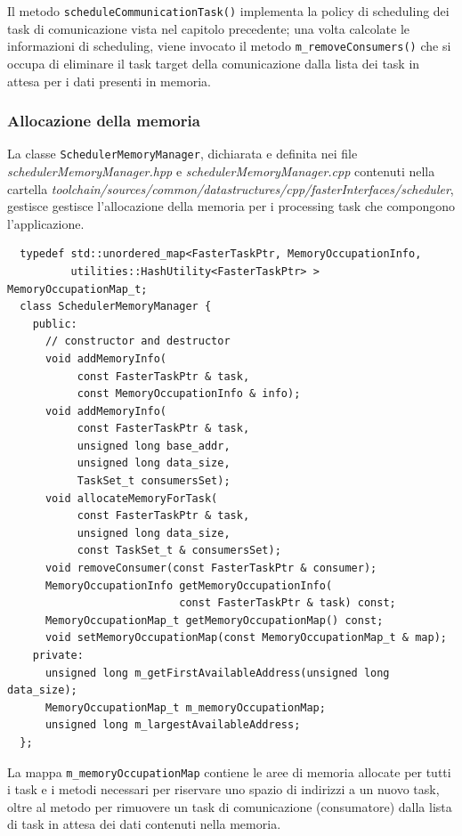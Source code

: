 Il metodo \verb+scheduleCommunicationTask()+ implementa la policy di scheduling dei
task di comunicazione vista nel capitolo precedente; una volta calcolate le informazioni
di scheduling, viene invocato il metodo \verb+m_removeConsumers()+ che si occupa di
eliminare il task target della comunicazione dalla lista dei task in attesa per
i dati presenti in memoria.

\subsubsection{Allocazione della memoria}
La classe \verb+SchedulerMemoryManager+, dichiarata e definita nei file
\emph{schedulerMemoryManager.hpp} e \emph{schedulerMemoryManager.cpp} contenuti nella cartella
\emph{toolchain/sources/common/datastructures/cpp/fasterInterfaces/scheduler}, gestisce
gestisce l'allocazione della memoria per i processing task che compongono l'applicazione.
\newline
\begin{verbatim}
  typedef std::unordered_map<FasterTaskPtr, MemoryOccupationInfo,
          utilities::HashUtility<FasterTaskPtr> > MemoryOccupationMap_t;
  class SchedulerMemoryManager {
    public:
      // constructor and destructor
      void addMemoryInfo(
           const FasterTaskPtr & task,
           const MemoryOccupationInfo & info);
      void addMemoryInfo(
           const FasterTaskPtr & task,
           unsigned long base_addr,
           unsigned long data_size,
           TaskSet_t consumersSet);
      void allocateMemoryForTask(
           const FasterTaskPtr & task,
           unsigned long data_size,
           const TaskSet_t & consumersSet);
      void removeConsumer(const FasterTaskPtr & consumer);
      MemoryOccupationInfo getMemoryOccupationInfo(
                           const FasterTaskPtr & task) const;
      MemoryOccupationMap_t getMemoryOccupationMap() const;
      void setMemoryOccupationMap(const MemoryOccupationMap_t & map);
    private:
      unsigned long m_getFirstAvailableAddress(unsigned long data_size);          
      MemoryOccupationMap_t m_memoryOccupationMap;          
      unsigned long m_largestAvailableAddress;
  };
\end{verbatim}

La mappa \verb+m_memoryOccupationMap+ contiene le aree di memoria allocate per tutti i
task e i metodi necessari per riservare uno spazio di indirizzi a un nuovo task, oltre
al metodo per rimuovere un task di comunicazione (consumatore) dalla lista di task in
attesa dei dati contenuti nella memoria.
